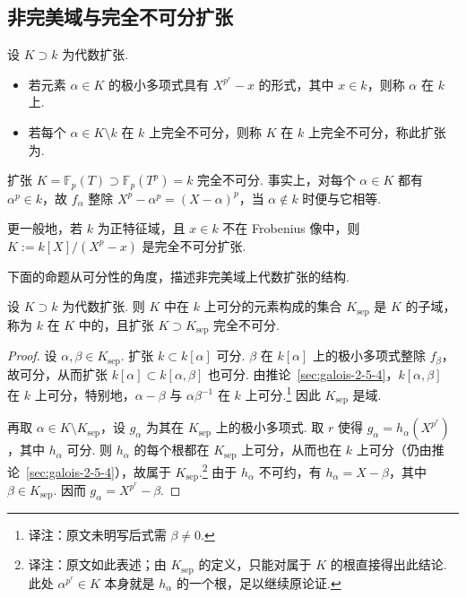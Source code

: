 \subsection{非完美域与完全不可分扩张}\label{sec:galois-2-6-3}
\begin{definition*}
设 $K\supset k$ 为代数扩张.
\begin{itemize}
\item 若元素 $\alpha\in K$ 的极小多项式具有 $X^{p^r}-x$ 的形式，其中 $x\in k$，则称 $\alpha$ 在 $k$ 上.
\item 若每个 $\alpha\in K\setminus k$ 在 $k$ 上完全不可分，则称 $K$ 在 $k$ 上完全不可分，称此扩张为.
\end{itemize}
\end{definition*}
\begin{example*}
扩张 $K=\mathbb F_p(T)\supset\mathbb F_p(T^p)=k$ 完全不可分. 事实上，对每个 $\alpha\in K$ 都有 $\alpha^p\in k$，故 $f_\alpha$ 整除 $X^p-\alpha^p=(X-\alpha)^p$，当 $\alpha\notin k$ 时便与它相等.

更一般地，若 $k$ 为正特征域，且 $x\in k$ 不在 Frobenius 像中，则 $K:=k[X]/(X^p-x)$ 是完全不可分扩张.
\end{example*}
下面的命题从可分性的角度，描述非完美域上代数扩张的结构.
\begin{proposition*}
设 $K\supset k$ 为代数扩张. 则 $K$ 中在 $k$ 上可分的元素构成的集合 $K_{\mathrm{sep}}$ 是 $K$ 的子域，称为 $k$ 在 $K$ 中的，且扩张 $K\supset K_{\mathrm{sep}}$ 完全不可分.
\end{proposition*}
\begin{proof}
设 $\alpha,\beta\in K_{\mathrm{sep}}$. 扩张 $k\subset k[\alpha]$ 可分. $\beta$ 在 $k[\alpha]$ 上的极小多项式整除 $f_\beta$，故可分，从而扩张 $k[\alpha]\subset k[\alpha,\beta]$ 也可分. 由推论~\ref{sec:galois-2-5-4}，$k[\alpha,\beta]$ 在 $k$ 上可分，特别地，$\alpha-\beta$ 与 $\alpha\beta^{-1}$ 在 $k$ 上可分.\footnote{译注：原文未明写后式需 $\beta\ne0$.} 因此 $K_{\mathrm{sep}}$ 是域.

再取 $\alpha\in K\setminus K_{\mathrm{sep}}$，设 $g_\alpha$ 为其在 $K_{\mathrm{sep}}$ 上的极小多项式. 取 $r$ 使得 $g_\alpha=h_\alpha(X^{p^r})$，其中 $h_\alpha$ 可分. 则 $h_\alpha$ 的每个根都在 $K_{\mathrm{sep}}$ 上可分，从而也在 $k$ 上可分（仍由推论~\ref{sec:galois-2-5-4}），故属于 $K_{\mathrm{sep}}$.\footnote{译注：原文如此表述；由 $K_{\mathrm{sep}}$ 的定义，只能对属于 $K$ 的根直接得出此结论. 此处 $\alpha^{p^r}\in K$ 本身就是 $h_\alpha$ 的一个根，足以继续原论证.} 由于 $h_\alpha$ 不可约，有 $h_\alpha=X-\beta$，其中 $\beta\in K_{\mathrm{sep}}$. 因而 $g_\alpha=X^{p^r}-\beta$.
\end{proof}
